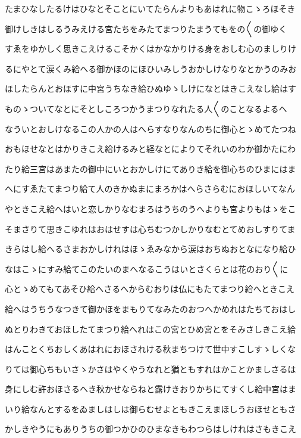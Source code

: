\documentclass[a4paper,11pt,landscape]{ltjtarticle}
\begin{document}
たまひなしたるけはひなとそことにいてたらんよりもあはれに物こゝろほそき
\par\medskip
御けしきはしるうみえける宮たちをみたてまつりたまうてもをの〱の御ゆく
\par\medskip
すゑをゆかしく思きこえけるこそかくはかなかりける身をおしむ心のましりけ
\par\medskip
るにやとて涙くみ給へる御かほのにほひいみしうおかしけなりなとかうのみお
\par\medskip
ほしたらんとおほすに中宮うちなき給ひぬゆゝしけになとはきこえなし給はす
\par\medskip
ものゝついてなとにそとしころつかうまつりなれたる人〱のことなるよるへ
\par\medskip
なういとおしけなるこの人かの人はへらすなりなんのちに御心とゝめてたつね
\par\medskip
おもほせなとはかりきこえ給けるみと経なとによりてそれいのわか御かたにわ
\par\medskip
たり給三宮はあまたの御中にいとおかしけにてありき給を御心ちのひまにはま
\par\medskip
へにすゑたてまつり給て人のきかぬまにまろかはへらさらむにおほしいてなん
\par\medskip
やときこえ給へはいと恋しかりなむまろはうちのうへよりも宮よりもはゝをこ
\par\medskip
そまさりて思きこゆれはおはせすは心ちむつかしかりなむとてめおしすりてま
\par\medskip
きらはし給へるさまおかしけれはほゝゑみなから涙はおちぬおとなになり給ひ
\par\medskip
なはこゝにすみ給てこのたいのまへなるこうはいとさくらとは花のおり〱に
\par\medskip
心とゝめてもてあそひ給へさるへからむおりは仏にもたてまつり給へときこえ
\par\medskip
給へはうちうなつきて御かほをまもりてなみたのおつへかめれはたちておはし
\par\medskip
ぬとりわきておほしたてまつり給へれはこの宮とひめ宮とをそみさしきこえ給
\par\medskip
はんことくちおしくあはれにおほされける秋まちつけて世中すこしすゝしくな
\par\medskip
りては御心ちもいさゝかさはやくやうなれと猶ともすれはかことかましさるは
\par\medskip
身にしむ許おほさるへき秋かせならねと露けきおりかちにてすくし給中宮はま
\par\medskip
いり給なんとするをゐましはしは御らむせよともきこえまほしうおほせともさ
\par\medskip
かしきやうにもありうちの御つかひのひまなきもわつらはしけれはさもきこえ
\end{document}
